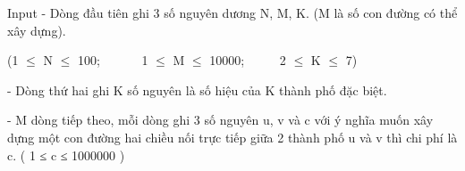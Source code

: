 Input
- Dòng đầu tiên ghi 3 số nguyên dương N, M, K. (M là số con đường có thể xây dựng).

(1  $\le$  N  $\le$  100;       1  $\le$  M  $\le$  10000;      2  $\le$  K  $\le$  7)

- Dòng thứ hai ghi K số nguyên là số hiệu của K thành phố đặc biệt.

- M dòng tiếp theo, mỗi dòng ghi 3 số nguyên u, v và c với ý nghĩa muốn xây dựng một con đường hai chiều nối trực tiếp giữa 2 thành phố u và v thì chi phí là c. ( 1 ≤ c ≤ 1000000 )